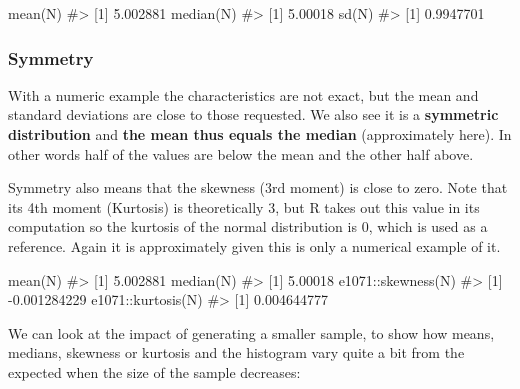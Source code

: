 \documentclass[
  letterpaper,
  DIV=11,
  numbers=noendperiod]{scrreprt}
\newenvironment{Shaded}{\begin{snugshade}}{\end{snugshade}}
\newcommand{\CommentTok}[1]{\textcolor[rgb]{0.37,0.37,0.37}{#1}}
\newcommand{\FunctionTok}[1]{\textcolor[rgb]{0.28,0.35,0.67}{#1}}
\newcommand{\NormalTok}[1]{\textcolor[rgb]{0.00,0.23,0.31}{#1}}
\newcommand{\SpecialCharTok}[1]{\textcolor[rgb]{0.37,0.37,0.37}{#1}}
\begin{document}
\begin{Shaded}
\begin{Highlighting}[]
\FunctionTok{mean}\NormalTok{(N)}
\CommentTok{\#\textgreater{} [1] 5.002881}
\FunctionTok{median}\NormalTok{(N)}
\CommentTok{\#\textgreater{} [1] 5.00018}
\FunctionTok{sd}\NormalTok{(N)}
\CommentTok{\#\textgreater{} [1] 0.9947701}
\end{Highlighting}
\end{Shaded}

\subsubsection{Symmetry}\label{symmetry}

With a numeric example the characteristics are not exact, but the mean
and standard deviations are close to those requested. We also see it is
a \textbf{symmetric distribution} and \textbf{the mean thus equals the
median} (approximately here). In other words half of the values are
below the mean and the other half above.

Symmetry also means that the skewness (3rd moment) is close to zero.
Note that its 4th moment (Kurtosis) is theoretically 3, but R takes out
this value in its computation so the kurtosis of the normal distribution
is 0, which is used as a reference. Again it is approximately given this
is only a numerical example of it.

\begin{Shaded}
\begin{Highlighting}[]
\FunctionTok{mean}\NormalTok{(N)}
\CommentTok{\#\textgreater{} [1] 5.002881}
\FunctionTok{median}\NormalTok{(N)}
\CommentTok{\#\textgreater{} [1] 5.00018}
\NormalTok{e1071}\SpecialCharTok{::}\FunctionTok{skewness}\NormalTok{(N)}
\CommentTok{\#\textgreater{} [1] {-}0.001284229}
\NormalTok{e1071}\SpecialCharTok{::}\FunctionTok{kurtosis}\NormalTok{(N)}
\CommentTok{\#\textgreater{} [1] 0.004644777}
\end{Highlighting}
\end{Shaded}

We can look at the impact of generating a smaller sample, to show how
means, medians, skewness or kurtosis and the histogram vary quite a bit
from the expected when the size of the sample decreases:
\end{document}
